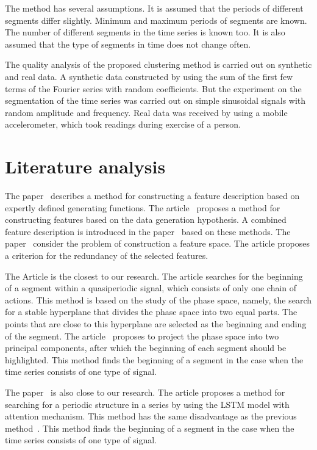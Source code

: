 \documentclass[12pt, twoside]{article}
\numberwithin{equation}{section}
\begin{document}
The method has several assumptions.
It is assumed that the periods of different segments differ slightly. Minimum and maximum periods of segments are known. The number of different segments in the time series is known too.
It is also assumed that the type of segments in time does not change often.

The quality analysis of the proposed clustering method is carried out on synthetic and real data.
A synthetic data constructed by using the sum of the first few terms of the Fourier series with random coefficients. But the experiment on the segmentation of the time series was carried out on simple sinusoidal signals with random amplitude and frequency.
Real data was received by using a mobile accelerometer, which took readings during exercise of a person.

\section{Literature analysis}
The paper~\cite{kwapisz2010} describes a method for constructing a feature description based on expertly defined generating functions.
The article~\cite{lukashin2003} proposes a method for constructing features based on the data generation hypothesis.
A combined feature description is introduced in the paper~\cite{Ivkin2015} based on these methods.
The paper~\cite{Katrutsa2015} consider the problem of construction a feature space. The article proposes a criterion for the redundancy of the selected features.

The Article\cite{motrenko2015} is the closest to our research.
The article searches for the beginning of a segment within a quasiperiodic signal, which consists of only one chain of actions.
This method is based on the study of the phase space, namely, the search for a stable hyperplane that divides the phase space into two equal parts.
The points that are close to this hyperplane are selected as the beginning and ending of the segment.
The article~\cite{motrenko2015} proposes to project the phase space into two principal components, after which the beginning of each segment should be highlighted.
This method finds the beginning of a segment in the case when the time series consists of one type of signal.

The paper~\cite{cinar2018} is also close to our research. 
The article proposes a method for searching for a periodic structure in a series by using the LSTM model with attention mechanism.
This method has the same disadvantage as the previous method~\cite{motrenko2015}. This method finds the beginning of a segment in the case when the time series consists of one type of signal.
\end{document}
